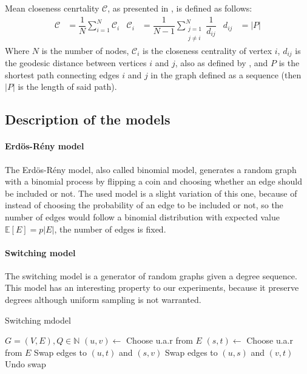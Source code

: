 
Mean closeness cenrtality $\mathcal{C}$, as presented in \cite{newman2018networks}, is defined as follows:
\begin{align*}
 \mathcal{C} &= \dfrac{1}{N}\sum_{i=1}^N\mathcal{C}_i & \mathcal{C}_i &= \dfrac{1}{N-1}\sum_{\substack{j=1\\j\neq i}}^N \dfrac{1}{d_{ij}}& d_{ij} &=|P|
\end{align*}
Where $N$ is the number of nodes, $\mathcal{C}_i$ is the closeness centrality of vertex $i$, $d_{ij}$ is the geodesic distance between vertices $i$ and $j$, also as defined by \cite{newman2018networks}, and $P$ is the shortest path connecting edges $i$ and $j$ in the graph defined as a sequence (then $|P|$ is the length of said path).
\subsection{Description of the models}
\paragraph{Erdös-Rény model}
The Erdös-Rény model, also called binomial model, generates a random graph with a binomial process by flipping a coin and choosing whether an edge should be included or not. The used model is a slight variation of this one, because of instead of choosing the probability of an edge to be included or not, so the number of edges would follow a binomial distribution with expected value $\mathbb{E}[E] = p |E|$, the number of edges is fixed.
\paragraph{Switching model}
The switching model is a generator of random graphs given a degree sequence. This model has an interesting property to our experiments, because it preserve degrees although uniform sampling is not warranted.
\begin{algorithm}[!htb]
\caption{Switching mdodel}\label{algo:switching-model}
\begin{algorithmic}
\Require $G = (V,E), Q \in \mathbb{N}$
    \State $(u,v) \gets$ Choose u.a.r from $E$
    \State $(s,t) \gets$ Choose u.a.r from $E$
        \State Swap edges to $(u,t)$ and $(s,v)$
    \Else
        \State Swap edges to $(u,s)$ and $(v,t)$
    \EndIf
        \State Undo swap
    \EndIf
\EndFor
\end{algorithmic}
\end{algorithm}

